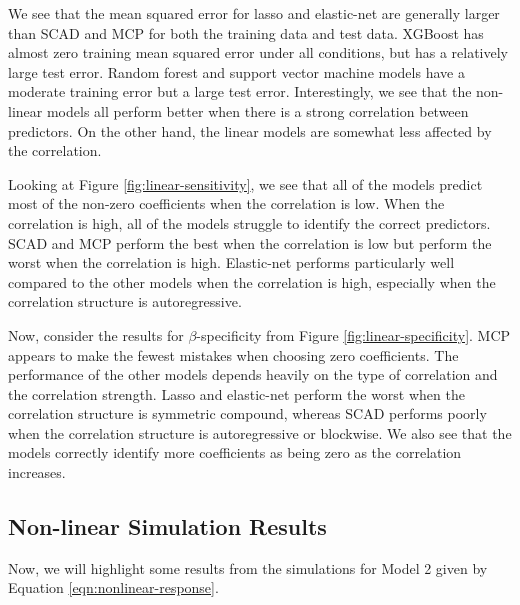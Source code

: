 \documentclass[final,onefignum,onetabnum]{siuro210301}
\begin{document}
	We see that the mean squared error for lasso and elastic-net are generally larger than SCAD and MCP for both the training data and test data. XGBoost has almost zero training mean squared error under all conditions, but has a relatively large test error. Random forest and support vector machine models have a moderate training error but a large test error. Interestingly, we see that the non-linear models all perform better when there is a strong correlation between predictors. On the other hand, the linear models are somewhat less affected by the correlation.
	
	Looking at Figure \ref{fig:linear-sensitivity}, we see that all of the models predict most of the non-zero coefficients when the correlation is low. When the correlation is high, all of the models struggle to identify the correct predictors. SCAD and MCP perform the best when the correlation is low but perform the worst when the correlation is high. Elastic-net performs particularly well compared to the other models when the correlation is high, especially when the correlation structure is autoregressive.
	
	Now, consider the results for $\beta$-specificity from Figure \ref{fig:linear-specificity}. MCP appears to make the fewest mistakes when choosing zero coefficients. The performance of the other models depends heavily on the type of correlation and the correlation strength. Lasso and elastic-net perform the worst when the correlation structure is symmetric compound, whereas SCAD performs poorly when the correlation structure is autoregressive or blockwise. We also see that the models correctly identify more coefficients as being zero as the correlation increases.
	
	\subsection{Non-linear Simulation Results}
	Now, we will highlight some results from the simulations for Model 2 given by Equation \ref{eqn:nonlinear-response}.
	
\end{document}
